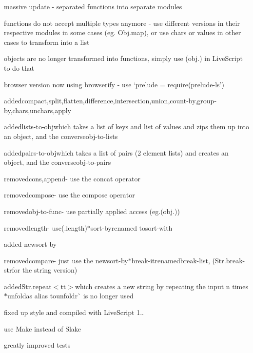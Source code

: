 \begin{DoxyItemize}
\item massive update -\/ separated functions into separate modules
\item functions do not accept multiple types anymore -\/ use different versions in their respective modules in some cases (eg. {\ttfamily Obj.\+map}), or use {\ttfamily chars} or {\ttfamily values} in other cases to transform into a list
\item objects are no longer transformed into functions, simply use {\ttfamily (obj.)} in Live\+Script to do that
\item browser version now using browserify -\/ use `prelude = require(\textquotesingle{}prelude-\/ls'){\ttfamily }
\item {\ttfamily added}compact{\ttfamily ,}split{\ttfamily ,}flatten{\ttfamily ,}difference{\ttfamily ,}intersection{\ttfamily ,}union{\ttfamily ,}count-\/by{\ttfamily ,}group-\/by{\ttfamily ,}chars{\ttfamily ,}unchars{\ttfamily ,}apply{\ttfamily }
\item {\ttfamily added}lists-\/to-\/obj{\ttfamily which takes a list of keys and list of values and zips them up into an object, and the converse}obj-\/to-\/lists{\ttfamily }
\item {\ttfamily added}pairs-\/to-\/obj{\ttfamily which takes a list of pairs (2 element lists) and creates an object, and the converse}obj-\/to-\/pairs{\ttfamily }
\item {\ttfamily removed}cons{\ttfamily ,}append{\ttfamily -\/ use the concat operator}
\item {\ttfamily removed}compose{\ttfamily -\/ use the compose operator}
\item {\ttfamily removed}obj-\/to-\/func{\ttfamily -\/ use partially applied access (eg.}(obj.){\ttfamily )}
\item {\ttfamily removed}length{\ttfamily -\/ use}(.length){\ttfamily  $\ast$}sort-\/by{\ttfamily renamed to}sort-\/with{\ttfamily }
\item {\ttfamily added new}sort-\/by{\ttfamily }
\item {\ttfamily removed}compare{\ttfamily -\/ just use the new}sort-\/by{\ttfamily  $\ast$}break-\/it{\ttfamily renamed}break-\/list{\ttfamily , (}Str.\+break-\/str{\ttfamily for the string version)}
\item {\ttfamily added}Str.\+repeat$<$tt$>$which creates a new string by repeating the input n times $\ast$unfold{\ttfamily as alias to}unfoldr\`{} is no longer used
\item fixed up style and compiled with Live\+Script 1..
\item use Make instead of Slake
\item greatly improved tests
\end{DoxyItemize}

